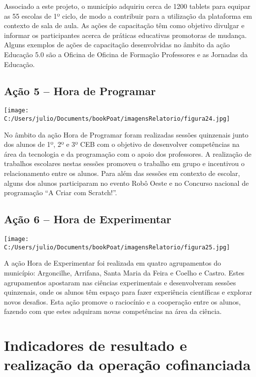 \documentclass[
]{book}
\begin{document}
Associado a este projeto, o município adquiriu cerca de 1200 tablets para equipar as 55 escolas de 1º ciclo, de modo a contribuir para a utilização da plataforma em contexto de sala de aula. As ações de capacitação têm como objetivo divulgar e informar os participantes acerca de práticas educativas promotoras de mudança. Alguns exemplos de ações de capacitação desenvolvidas no âmbito da ação Educação 5.0 são a Oficina de Oficina de Formação Professores e as Jornadas da Educação.

\hypertarget{auxe7uxe3o-5-hora-de-programar}{%
\subsection{\texorpdfstring{\textbf{Ação 5 -- Hora de Programar}}{Ação 5 -- Hora de Programar}}\label{auxe7uxe3o-5-hora-de-programar}}

\texttt{[image: C:/Users/julio/Documents/bookPoat/imagensRelatorio/figura24.jpg]}

No âmbito da ação Hora de Programar foram realizadas sessões quinzenais junto dos alunos de 1º, 2º e 3º CEB com o objetivo de desenvolver competências na área da tecnologia e da programação com o apoio dos professores. A realização de trabalhos escolares nestas sessões promoveu o trabalho em grupo e incentivou o relacionamento entre os alunos. Para além das sessões em contexto de escolar, alguns dos alunos participaram no evento Robô Oeste e no Concurso nacional de programação ``A Criar com Scratch!''.

\hypertarget{auxe7uxe3o-6-hora-de-experimentar}{%
\subsection{\texorpdfstring{\textbf{Ação 6 -- Hora de Experimentar }}{Ação 6 -- Hora de Experimentar }}\label{auxe7uxe3o-6-hora-de-experimentar}}

\texttt{[image: C:/Users/julio/Documents/bookPoat/imagensRelatorio/figura25.jpg]}

A ação Hora de Experimentar foi realizada em quatro agrupamentos do município: Argoncilhe, Arrifana, Santa Maria da Feira e Coelho e Castro. Estes agrupamentos apostaram nas ciências experimentais e desenvolveram sessões quinzenais, onde os alunos têm espaço para fazer experiência científicas e explorar novos desafios. Esta ação promove o raciocínio e a cooperação entre os alunos, fazendo com que estes adquiram novas competências na área da ciência.

\hypertarget{indicadores-de-resultado-e-realizauxe7uxe3o-da-operauxe7uxe3o-cofinanciada}{%
\section{Indicadores de resultado e realização da operação cofinanciada}\label{indicadores-de-resultado-e-realizauxe7uxe3o-da-operauxe7uxe3o-cofinanciada}}
\end{document}
